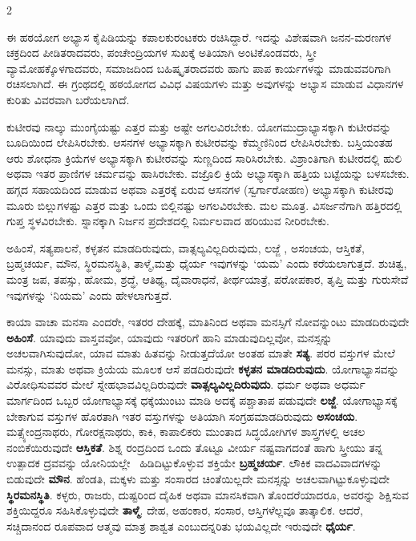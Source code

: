 \begin{multicols}{2}
\begin{kan}
ಈ ಹಠಯೋಗ ಅಭ್ಯಾಸ ಕೈಪಿಡಿಯನ್ನು ಕಪಾಲಕುರಂಟಕರು ರಚಿಸಿದ್ದಾರೆ. ಇದನ್ನು ವಿಶೇಷವಾಗಿ ಜನನ-ಮರಣಗಳ ಚಕ್ರದಿಂದ ಪೀಡಿತ\-ರಾದವರು, ಪಂಚೇಂದ್ರಿಯಗಳ ಸುಖಕ್ಕೆ ಅತಿಯಾಗಿ ಅಂಟಿಕೊಂಡ\-ವರು, ಸ್ತ್ರೀ ವ್ಯಾಮೋಹಕ್ಕೊಳಗಾದವರು, ಸಮಾಜದಿಂದ ಬಹಿಷ್ಕೃತರಾದವರು ಹಾಗು ಪಾಪ ಕಾರ್ಯಗಳನ್ನು ಮಾಡುವವರಿಗಾಗಿ ರಚಿಸಲಾಗಿದೆ. ಈ ಗ್ರಂಥದಲ್ಲಿ ಹಠಯೋಗದ ವಿವಿಧ ವಿಷಯಗಳು ಮತ್ತು ಅವುಗಳನ್ನು ಅಭ್ಯಾಸ ಮಾಡುವ ವಿಧಾನಗಳ ಕುರಿತು ವಿವರವಾಗಿ ಬರೆಯಲಾಗಿದೆ.
\vskip 7pt


ಕುಟೀರವು ನಾಲ್ಕು ಮುಂಗೈಯಷ್ಟು ಎತ್ತರ ಮತ್ತು ಅಷ್ಟೇ ಅಗಲವಿರಬೇಕು. ಯೋಗಮುದ್ರಾಭ್ಯಾಸಕ್ಕಾಗಿ ಕುಟೀರವನ್ನು ಬೂದಿಯಿಂದ ಲೇಪಿಸಿರಬೇಕು. ಆಸನಗಳ ಅಭ್ಯಾಸಕ್ಕಾಗಿ ಕುಟೀರವನ್ನು ಕೆಮ್ಮಣಿನಿಂದ ಲೇಪಿಸಿರಬೇಕು. ಬಸ್ತಿಯಂತಹ ಆರು ಶೋಧನಾ ಕ್ರಿಯೆಗಳ ಅಭ್ಯಾಸಕ್ಕಾಗಿ ಕುಟೀರವನ್ನು ಸುಣ್ಣದಿಂದ ಸಾರಿಸಿರಬೇಕು. ವಿಶ್ರಾಂತಿಗಾಗಿ ಕುಟೀರದಲ್ಲಿ ಹುಲಿ ಅಥವಾ ಇತರ ಪ್ರಾಣಿಗಳ ಚರ್ಮವನ್ನು ಹಾಸಿರಬೇಕು. ವಜ್ರೊಲಿ ಕ್ರಿಯೆ ಅಭ್ಯಾಸಕ್ಕಾಗಿ ಹತ್ತಿಯ ಬಟ್ಟೆಯನ್ನು ಬಳಸಬೇಕು. ಹಗ್ಗದ ಸಹಾಯದಿಂದ ಮಾಡುವ ಅಥವಾ  ಎತ್ತರಕ್ಕೆ ಏರುವ ಆಸನಗಳ (ಸ್ವರ್ಗಾರೋಹಣ) ಅಭ್ಯಾಸಕ್ಕಾಗಿ ಕುಟೀರವು ಮೂರು ಬಿಲ್ಲುಗಳಷ್ಟು ಎತ್ತರ ಮತ್ತು ಒಂದು ಬಿಲ್ಲಿನಷ್ಟು ಅಗಲವಿರಬೇಕು. ಮಲ ಮೂತ್ರ. ವಿಸರ್ಜನೆಗಾಗಿ ಹತ್ತಿರದಲ್ಲಿ ಗುಪ್ತ ಸ್ಥಳವಿರಬೇಕು. ಸ್ನಾನಕ್ಕಾಗಿ ನಿರ್ಜನ ಪ್ರದೇಶದಲ್ಲಿ ನಿರ್ಮಲವಾದ ಹರಿಯುವ ನೀರಿರಬೇಕು.
\vskip 7pt


ಅಹಿಂಸೆ, ಸತ್ಯಪಾಲನೆ, ಕಳ್ಳತನ ಮಾಡದಿರುವುದು, ವಾತ್ಸಲ್ಯವಿಲ್ಲದಿರುವುದು, ಲಜ್ಜೆ , ಅಸಂಚಯ, ಆಸ್ತಿಕತೆ,  ಬ್ರಹ್ಮಚರ್ಯ, ಮೌನ, ಸ್ಥಿರಮನಸ್ಥಿತಿ, ತಾಳ್ಮೆ,ಮತ್ತು ಧೈರ್ಯ ಇವುಗಳನ್ನು ‘ಯಮ’ ಎಂದು ಕರೆಯಲಾಗುತ್ತದೆ.  ಶುಚಿತ್ವ, ಮಂತ್ರ ಜಪ, ತಪಸ್ಸು, ಹೋಮ, ಶ್ರದ್ಧೆ, ಆತಿಥ್ಯ, ದೈವಾರಾಧನೆ, ತೀರ್ಥಯಾತ್ರೆ, ಪರೋಪಕಾರ, ತೃಪ್ತಿ ಮತ್ತು ಗುರುಸೇವೆ ಇವುಗಳನ್ನು ‘ನಿಯಮ’ ಎಂದು ಹೇಳಲಾಗುತ್ತದೆ.

ಕಾಯಾ ವಾಚಾ ಮನಸಾ ಎಂದರೇ, ಇತರರ ದೇಹಕ್ಕೆ, ಮಾತಿನಿಂದ ಅಥವಾ ಮನಸ್ಸಿಗೆ ನೋವನ್ನುಂಟು ಮಾಡದಿರುವುದೇ \textbf{ಅಹಿಂಸೆ}. ಯಾವುದು ವಾಸ್ತವವೋ, ಯಾವುದು ಇತರರಿಗೆ ಹಾನಿ ಮಾಡುವುದಿಲ್ಲವೋ, ಮನಸ್ಸನ್ನು ಅಚಲವಾಗಿಸುವುದೋ, ಯಾವ ಮಾತು ಹಿತವನ್ನು ನೀಡುತ್ತದೆಯೋ ಅಂತಹ ಮಾತೇ \textbf{ಸತ್ಯ}. ಪರರ ವಸ್ತುಗಳ ಮೇಲೆ ಮನಸ್ಸು, ಮಾತು ಅಥವಾ ಕ್ರಿಯೆಯ ಮೂಲಕ ಆಸೆ ಪಡದಿರುವುದೇ \textbf{ಕಳ್ಳತನ ಮಾಡದಿರುವುದು}. ಯೋಗಾಭ್ಯಾಸವನ್ನು ವಿರೋಧಿಸುವವರ ಮೇಲೆ ಸ್ನೇಹಭಾವವಿಲ್ಲದಿರುವುದೇ \textbf{ವಾತ್ಸಲ್ಯವಿಲ್ಲದಿರುವುದು}. ಧರ್ಮ ಅಥವಾ ಅಧರ್ಮ ಮಾರ್ಗದಿಂದ ಒಬ್ಬರ ಯೋಗಾಭ್ಯಾಸಕ್ಕೆ ಧಕ್ಕೆಯುಂಟು ಮಾಡಿ ಅದಕ್ಕೆ ಪಶ್ಚಾತಾಪ ಪಡುವುದೇ \textbf{ಲಜ್ಜೆ}. ಯೋಗಾಭ್ಯಾಸಕ್ಕೆ ಬೇಕಾಗುವ ವಸ್ತುಗಳ ಹೊರತಾಗಿ ಇತರ ವಸ್ತುಗಳನ್ನು ಅತಿಯಾಗಿ ಸಂಗ್ರಹಮಾಡದಿರುವುದು \textbf{ಅಸಂಚಯ}. ಮತ್ಸ್ಯೇಂದ್ರನಾಥರು, ಗೋರಕ್ಷನಾಥರು, ಕಾಕಿ, ಕಾಪಾಲಿಕರು ಮುಂತಾದ ಸಿದ್ಧಯೋಗಿಗಳ ಶಾಸ್ತ್ರಗಳಲ್ಲಿ ಅಚಲ ನಂಬಿಕೆಯಿರುವುದೇ \textbf{ಆಸ್ತಿಕತೆ}. ಶಿಶ್ನ ರಂದ್ರದಿಂದ ಒಂದು ತೊಟ್ಟೂ ವೀರ್ಯ ನಷ್ಟವಾಗದಂತೆ ಹಾಗು ಸ್ತ್ರೀಯು ತನ್ನ ಉತ್ಪಾದಕ ದ್ರವವನ್ನು ಯೋನಿಯಲ್ಲೇ  ಹಿಡಿದಿಟ್ಟುಕೊಳ್ಳುವ ಶಕ್ತಿಯೇ \textbf{ಬ್ರಹ್ಮಚರ್ಯ}. ಲೌಕಿಕ ವಾದವಿವಾದಗಳನ್ನು ಬಿಡುವುದೇ \textbf{ಮೌನ}. ಹೆಂಡತಿ, ಮಕ್ಕಳು ಮತ್ತು ಸಂಸಾರದ ಚಿಂತೆಯಿಲ್ಲದೇ ಮನಸ್ಸನ್ನು ಅಚಲವಾಗಿಟ್ಟುಕೂಳ್ಳುವುದೇ \textbf{ಸ್ಥಿರಮನಸ್ಥಿತಿ}. ಕಳ್ಳರು, ರಾಜರು, ದುಷ್ಟರಿಂದ ದೈಹಿಕ ಅಥವಾ ಮಾನಸಿಕವಾಗಿ ತೊಂದರೆಯಾದರೂ, ಅವರನ್ನು ಶಿಕ್ಷಿಸುವ ಶಕ್ತಿಯಿದ್ದರೂ ಸಹಿಸಿಕೊಳ್ಳುವುದೇ \textbf{ತಾಳ್ಮೆ}. ದೇಹ, ಅಹಂಕಾರ, ಸಂಸಾರ, ಆಸ್ತಿಗಳೆಲ್ಲವೂ ತಾತ್ಕಾಲಿಕ. ಆದರೆ, ಸಚ್ಚಿದಾನಂದ ರೂಪವಾದ ಆತ್ಮವು ಮಾತ್ರ ಶಾಶ್ವತ ಎಂಬುದನ್ನರಿತು ಭಯವಿಲ್ಲದೇ ಇರುವುದೇ  \textbf{ಧೈರ್ಯ}.


\end{kan}
\end{multicols}

